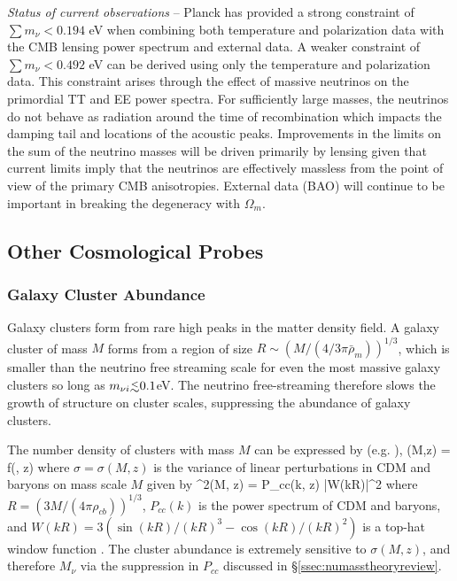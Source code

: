 {\it Status of current observations} -- Planck has provided a strong constraint of $\sum m_\nu < 0.194$ eV when combining both temperature and polarization data with the CMB lensing power spectrum and external data.  A weaker constraint of $\sum m_\nu < 0.492$ eV can be derived using only the temperature and polarization data.  This constraint arises through the effect of massive neutrinos on the primordial TT and EE power spectra.  For sufficiently large masses, the neutrinos do not behave as radiation around the time of recombination which impacts the damping tail and locations of the acoustic peaks.  Improvements in the limits on the sum of the neutrino masses will be driven primarily by lensing given that current limits imply that the neutrinos are effectively massless from the point of view of the primary CMB anisotropies.  External data (BAO) will continue to be important in breaking the degeneracy with $\Omega_m$.  

\subsection{Other Cosmological Probes}

\subsubsection{Galaxy Cluster Abundance}
Galaxy clusters form from rare high peaks in the matter density field. A galaxy cluster of mass $M$ forms from a region of size $R\sim \left(M/(4/3\pi \bar\rho_m)\right)^{1/3}$, which is smaller than the neutrino free streaming scale for even the most massive galaxy clusters so long as $m_{\nu i} \lsim 0.1$eV. The neutrino free-streaming therefore slows the growth of structure on cluster scales, suppressing the abundance of galaxy clusters. 


The number density of clusters with mass $M$ can be expressed by (e.g. \cite{Tinker:2008ff,Bhattacharya:2010wy}), 
\beq
\label{eq:clmfcn}
(M,z) =  f(\sigma, z)
\eeq
where $\sigma = \sigma(M,z)$ is the variance of linear perturbations in CDM and baryons on mass scale $M$ given by
\beq
\label{eq:sigmaM}
\sigma^2(M, z) = \int {}  P_{cc}(k, z) |W(kR)|^2
\eeq
where $R = (3M/(4\pi \rho_{cb}))^{1/3}$, $P_{cc}(k)$ is the power spectrum of CDM and baryons, and $W(kR) = 3(\sin(kR)/(kR)^3 - \cos(kR)/(kR)^2)$ is a top-hat window function \cite{Costanzi:2013bha,LoVerde:2014rxa}. The cluster abundance is extremely sensitive to $\sigma(M, z)$, and therefore $M_\nu$ via the suppression in $P_{cc}$ discussed in \S\ref{ssec:numasstheoryreview}.

